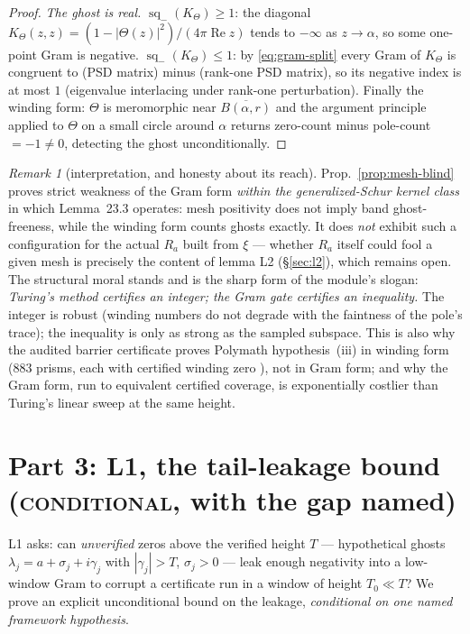 \documentclass[11pt]{article}
\theoremstyle{definition}
\theoremstyle{remark}
\newtheorem{remark}[theorem]{Remark}
\newcommand{\sq}{\operatorname{sq}_{-}}
\newcommand{\re}{\operatorname{Re}}
\begin{document}
\begin{proof}
\emph{The ghost is real.} $\sq(K_\Theta)\ge1$: the diagonal
$K_\Theta(z,z)=(1-|\Theta(z)|^2)/(4\pi\re z)$ tends to $-\infty$ as
$z\to\alpha$, so some one-point Gram is negative. $\sq(K_\Theta)\le1$: by
\eqref{eq:gram-split} every Gram of $K_\Theta$ is congruent to
(PSD matrix) minus (rank-one PSD matrix), so its negative index is at most
$1$ (eigenvalue interlacing under rank-one perturbation). Finally the winding
form: $\Theta$ is meromorphic near $\overline{B(\alpha,r)}$ and the argument
principle applied to $\Theta$ on a small circle around $\alpha$ returns
zero-count minus pole-count $=-1\neq0$, detecting the ghost unconditionally.
\end{proof}

\begin{remark}[interpretation, and honesty about its reach]
Prop.~\ref{prop:mesh-blind} proves strict weakness of the Gram form
\emph{within the generalized-Schur kernel class} in which Lemma~23.3
operates: mesh positivity does not imply band ghost-freeness, while the
winding form counts ghosts exactly. It does \emph{not} exhibit such a
configuration for the actual $R_a$ built from $\xi$ --- whether $R_a$ itself
could fool a given mesh is precisely the content of lemma L2
(\S\ref{sec:l2}), which remains open. The structural moral stands and is the
sharp form of the module's slogan: \emph{Turing's method certifies an
integer; the Gram gate certifies an inequality.} The integer is robust
(winding numbers do not degrade with the faintness of the pole's trace); the
inequality is only as strong as the sampled subspace. This is also why the
audited barrier certificate proves Polymath hypothesis~(iii) in winding form
(883 prisms, each with certified winding zero \cite{BarrierCert}), not in
Gram form; and why the Gram form, run to equivalent certified coverage, is
exponentially costlier than Turing's linear sweep at the same height.
\end{remark}

\section{Part 3: L1, the tail-leakage bound (\textsc{conditional}, with the
gap named)}\label{sec:l1}

L1 asks: can \emph{unverified} zeros above the verified height $T$ ---
hypothetical ghosts $\lambda_j=a+\sigma_j+i\gamma_j$ with $|\gamma_j|>T$,
$\sigma_j>0$ --- leak enough negativity into a low-window Gram to corrupt a
certificate run in a window of height $T_0\ll T$? We prove an explicit
unconditional bound on the leakage, \emph{conditional on one named framework
hypothesis}.
\end{document}
